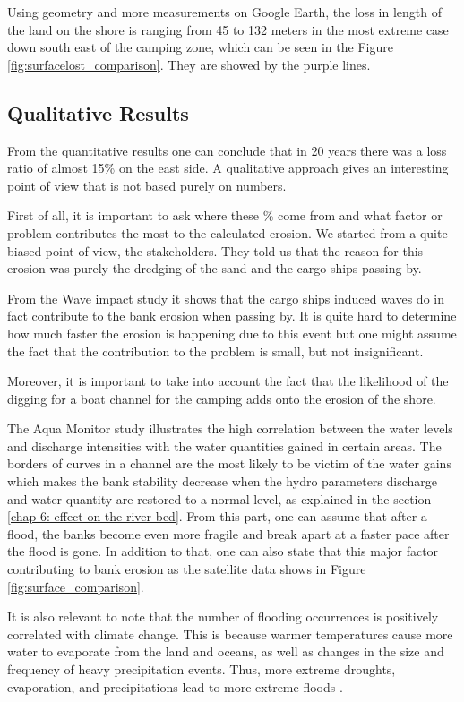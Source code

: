 Using geometry and more measurements on Google Earth, the loss in length of the land on the shore is ranging from 45 to 132 meters in the most extreme case down south east of the camping zone, which can be seen in the Figure \ref{fig:surfacelost_comparison}. They are showed by the purple lines.

\subsection{Qualitative Results}
From the quantitative results one can conclude that in 20 years there was a loss ratio of almost 15\% on the east side. A qualitative approach gives an interesting point of view that is not based purely on numbers.

First of all, it is important to ask where these \% come from and what factor or problem contributes the most to the calculated erosion. We started from a quite biased point of view, the stakeholders. They told us that the reason for this erosion was purely the dredging of the sand and the cargo ships passing by. 

From the Wave impact study it shows that the cargo ships induced waves do in fact contribute to the bank erosion when passing by. It is quite hard to determine how much faster the erosion is happening due to this event but one might assume the fact that the contribution to the problem is small, but not insignificant. 

Moreover, it is important to take into account the fact that the likelihood of the digging for a boat channel for the camping adds onto the erosion of the shore.

The Aqua Monitor study illustrates the high correlation between the water levels and discharge intensities with the water quantities gained in certain areas. The borders of curves in a channel are the most likely to be victim of the water gains which makes the bank stability decrease when the hydro parameters discharge and water quantity are restored to a normal level, as explained in the section \ref{chap 6: effect on the river bed}. From this part, one can assume that after a flood, the banks become even more fragile and break apart at a faster pace after the flood is gone.
In addition to that, one can also state that this major factor contributing to bank erosion as the satellite data shows in Figure \ref{fig:surface_comparison}.

It is also relevant to note that the number of flooding occurrences is positively correlated with climate change. This is because warmer temperatures cause more water to evaporate from the land and oceans, as well as changes in the size and frequency of heavy precipitation events. Thus, more extreme droughts, evaporation, and precipitations lead to more extreme floods \autocite{usepaClimateChangeIndicators2016}.

